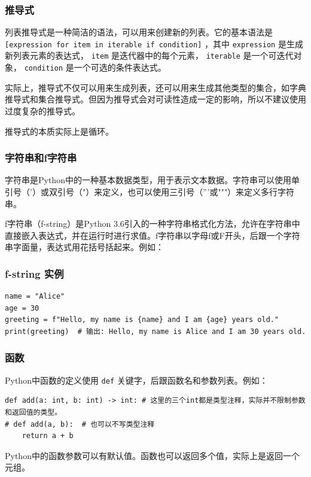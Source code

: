 \begin{frame}
    \frametitle{推导式}

    列表推导式是一种简洁的语法，可以用来创建新的列表。它的基本语法是 \texttt{[expression for item in iterable if condition]} ，其中 \texttt{expression} 是生成新列表元素的表达式， \texttt{item} 是迭代器中的每个元素， \texttt{iterable} 是一个可迭代对象， \texttt{condition} 是一个可选的条件表达式。

    实际上，推导式不仅可以用来生成列表，还可以用来生成其他类型的集合，如字典推导式和集合推导式。但因为推导式会对可读性造成一定的影响，所以不建议使用过度复杂的推导式。

    推导式的本质实际上是循环。

\end{frame}

\begin{frame}[fragile]
    \frametitle{字符串和f字符串}

    字符串是Python中的一种基本数据类型，用于表示文本数据。字符串可以使用单引号（'）或双引号（"）来定义，也可以使用三引号（'''或"""）来定义多行字符串。

    f字符串（f-string）是Python 3.6引入的一种字符串格式化方法，允许在字符串中直接嵌入表达式，并在运行时进行求值。f字符串以字母f或F开头，后跟一个字符串字面量，表达式用花括号{}括起来。例如：

\end{frame}

\begin{frame}[fragile]
    \frametitle{f-string 实例}

    \begin{verbatim}
name = "Alice"
age = 30
greeting = f"Hello, my name is {name} and I am {age} years old."
print(greeting)  # 输出: Hello, my name is Alice and I am 30 years old.
    \end{verbatim}


\end{frame}

\begin{frame}[fragile]
    \frametitle{函数}

    Python中函数的定义使用 \texttt{def} 关键字，后跟函数名和参数列表。例如：
    \begin{verbatim}
def add(a: int, b: int) -> int: # 这里的三个int都是类型注释，实际并不限制参数和返回值的类型。
# def add(a, b):  # 也可以不写类型注释
    return a + b
    \end{verbatim}
    Python中的函数参数可以有默认值。函数也可以返回多个值，实际上是返回一个元组。

\end{frame}


